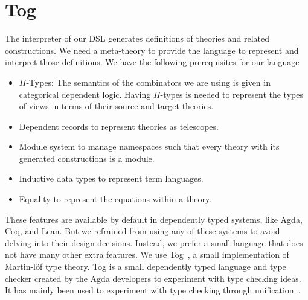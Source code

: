 \chapter{Tog}
\label{ch:tog}

The interpreter of our DSL generates definitions of theories and related constructions. We need a meta-theory to provide the language to represent and interpret those definitions. We have the following prerequisites for our language 
\begin{itemize}
\item $\Pi$-Types: The semantics of the combinators we are using is given in categorical dependent logic. Having $\Pi$-types is needed to represent the types of views in terms of their source and target theories. 
\item Dependent records to represent theories as telescopes. 
\item Module system to manage namespaces such that every theory with its generated constructions is a module. 
\item Inductive data types to represent term languages. 
\item Equality to represent the equations within a theory. 
\end{itemize}

These features are available by default in dependently typed systems, like Agda, Coq, and Lean. But we refrained from using any of these systems to avoid delving into their design decisions. Instead, we prefer a small language that does not have many other extra features. We use Tog~\cite{tog}, a small implementation of Martin-l\"{o}f type theory. 
Tog is a small dependently typed language and type checker created by the Agda developers to experiment with type checking ideas. It has mainly been used to experiment with type checking through unification~\cite{mazzoli2016type}. 

